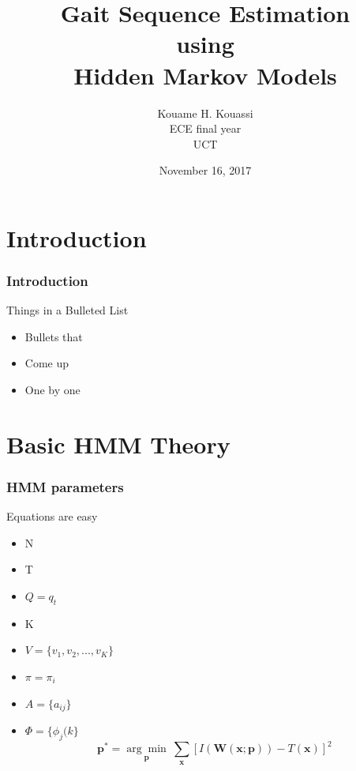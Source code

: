 \documentclass[serif,mathserif]{beamer}
\author[Kouame Kouassi]{Kouame H. Kouassi\\ \quad ECE final year\\ \quad UCT}
\title[Short Title\hspace{2em}\insertframenumber/\inserttotalframenumber]{Gait Sequence Estimation \\using \\Hidden Markov Models}
\date{November 16, 2017} %
\institute{Final year project presentation}
\begin{document}
\maketitle

 \section{Introduction}  %


\begin{frame}
  \frametitle{Introduction}
  Things in a Bulleted List\pause
  \begin{itemize}
  \item Bullets that\pause
  \item Come up\pause
  \item One by one %
  \end{itemize}
\end{frame}

\section{Basic HMM Theory} %

\begin{frame}
  \frametitle{HMM parameters}
  
  Equations are easy
  \begin{itemize}
  	\item N  \pause%
  	\item T \pause%
  	\item \(Q = {q_t}\) \pause%
  	\item K \pause%
  	\item \(V = \{v_1, v_2, ..., v_K\}\) \pause%
  	\item \(\pi = {\pi_i}\)
  	\item \(A =  \{a_{ij} \}\) \pause%
  	\item \(\Phi =   \{ \phi_{j}(k\}\) \pause%
    \begin{equation*}
      \textbf{p}^* = \underset{\textbf{p}}{\arg\!\min}~\sum_{\textbf{x}}\left[ I(\textbf{W}(\textbf{x};\textbf{p})) - T(\textbf{x}) \right]^2
    \end{equation*}
  \end{itemize}
\end{frame}
\end{document}
